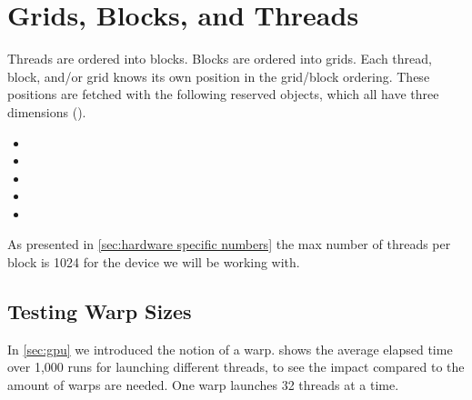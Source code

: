 \section{Grids, Blocks, and Threads}
\label{sec:grids blocks threads}

Threads are ordered into blocks.
Blocks are ordered into grids.
Each thread, block, and/or grid knows its own position in the grid/block ordering.
These positions are fetched with the following reserved objects, which all have three dimensions ().

\begin{itemize}
  \item {}
  \item {} 
  \item {} 
  \item {} 
  \item {}
\end{itemize}

As presented in \cref{sec:hardware specific numbers} the max number of threads per block is 1024 for the device we will be working with.

\subsection{Testing Warp Sizes}
\label{sec:testing warp sizes}

In \cref{sec:gpu} we introduced the notion of a warp.
 shows the average elapsed time over 1,000 runs for launching different threads, to see the impact compared to the amount of warps are needed.
One warp launches 32 threads at a time.


